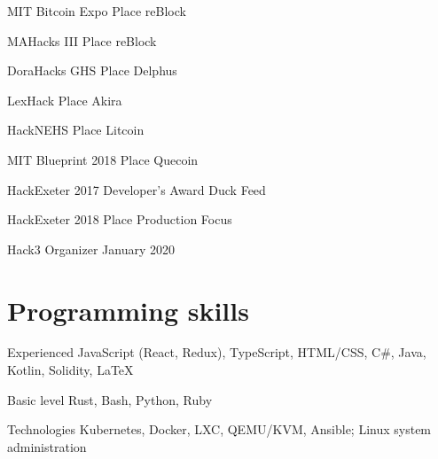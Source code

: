 \documentclass[paper=letter]{tccv}
\begin{document}
\begin{yearlist}

\item{MIT Bitcoin Expo}
     { Place}
     {reBlock}

\item{MAHacks III}
     { Place}
     {reBlock}

\item{DoraHacks GHS}
     { Place}
     {Delphus}

\item{LexHack}
     { Place}
     {Akira}

\item{HackNEHS}
     { Place}
     {Litcoin}

\item{MIT Blueprint 2018}
     { Place}
     {Quecoin}

\item{HackExeter 2017}
     {Developer's Award}
     {Duck Feed}

\item{HackExeter 2018}
     { Place}
     {Production Focus}

\item{Hack3}
     {Organizer}
     {January 2020}
\end{yearlist}

\section{Programming skills}

\begin{factlist}

\item{Experienced}
     {JavaScript (React, Redux), TypeScript, HTML/CSS, C\#, Java, Kotlin, Solidity, \LaTeX}

\item{Basic level}
     {Rust, Bash, Python, Ruby}

\item{Technologies}
     {Kubernetes, Docker, LXC, QEMU/KVM, Ansible; Linux system administration}

\end{factlist}
\end{document}
